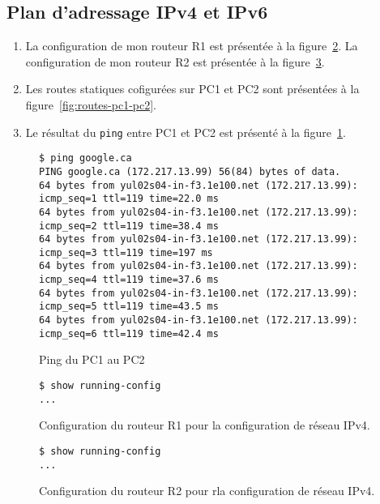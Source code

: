\documentclass[]{article}
\begin{document}
\subsection*{Plan d'adressage IPv4 et IPv6}

\begin{enumerate}
      \item La configuration de mon routeur R1 est présentée à la figure~\ref{fig:ipv4-config-r1}. La configuration
            de mon routeur R2 est présentée à la figure~\ref{fig:ipv4-config-r2}.
      \item Les routes statiques cofigurées sur PC1 et PC2 sont présentées à la figure~\ref{fig:routes-pc1-pc2}.
      \item  Le résultat du \texttt{ping} entre PC1 et PC2 est présenté à la figure~\ref{fig:ping-pc1-pc2}.
\end{enumerate}


\begin{figure} 
      \centering
      \begin{lstlisting}
$ ping google.ca
PING google.ca (172.217.13.99) 56(84) bytes of data.
64 bytes from yul02s04-in-f3.1e100.net (172.217.13.99): icmp_seq=1 ttl=119 time=22.0 ms
64 bytes from yul02s04-in-f3.1e100.net (172.217.13.99): icmp_seq=2 ttl=119 time=38.4 ms
64 bytes from yul02s04-in-f3.1e100.net (172.217.13.99): icmp_seq=3 ttl=119 time=197 ms
64 bytes from yul02s04-in-f3.1e100.net (172.217.13.99): icmp_seq=4 ttl=119 time=37.6 ms
64 bytes from yul02s04-in-f3.1e100.net (172.217.13.99): icmp_seq=5 ttl=119 time=43.5 ms
64 bytes from yul02s04-in-f3.1e100.net (172.217.13.99): icmp_seq=6 ttl=119 time=42.4 ms
      \end{lstlisting}
      \caption[]{Ping du PC1 au PC2}
      \label{fig:ping-pc1-pc2}
\end{figure}

\begin{figure} 
      \centering
      \begin{lstlisting}
$ show running-config
...
      \end{lstlisting}
      \caption[]{Configuration du routeur R1 pour la configuration de réseau IPv4.}
      \label{fig:ipv4-config-r1}
\end{figure}

\begin{figure} 
      \centering
      \begin{lstlisting}
$ show running-config 
...
      \end{lstlisting}
      \caption[]{Configuration du routeur R2 pour rla configuration de réseau IPv4.}
      \label{fig:ipv4-config-r2}
\end{figure}
\end{document}

